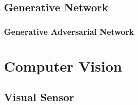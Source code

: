 \subsection{Generative Network}
\subsubsection{Generative Adversarial Network}


\section{Computer Vision}
\subsection{Visual Sensor}
